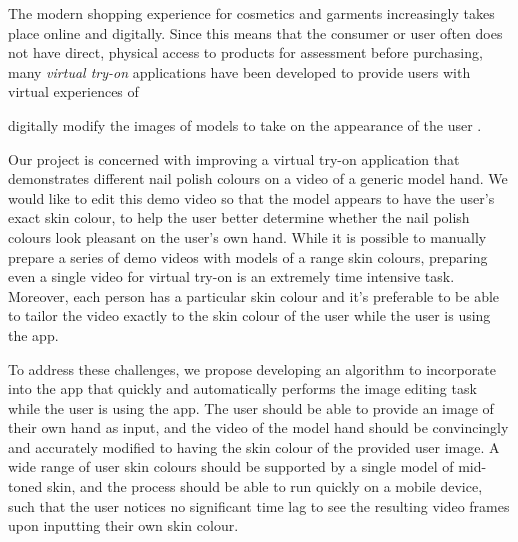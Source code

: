 The modern shopping experience for cosmetics and garments increasingly takes place online and digitally. Since this means that the consumer or user often does not have direct, physical access to products for assessment before purchasing, many \textit{virtual try-on} applications have been developed to provide users with virtual experiences of 

digitally modify the images of models to take on the appearance of the user \cite{zhang_2017_try} \cite{shilkrot_2013_garment, li_2015_replace}.


Our project is concerned with improving a virtual try-on application that demonstrates different nail polish colours on a video of a generic model hand. We would like to edit this demo video so that the model appears to have the user's exact skin colour, to help the user better determine whether the nail polish colours look pleasant on the user's own hand. While it is possible to manually prepare a series of demo videos with models of a range skin colours, preparing even a single video for virtual try-on is an extremely time intensive task. Moreover, each person has a particular skin colour and it's preferable to be able to tailor the video exactly to the skin colour of the user while the user is using the app.

To address these challenges, we propose developing an algorithm to incorporate into the app that quickly and automatically performs the image editing task while the user is using the app. The user should be able to provide an image of their own hand as input, and the video of the model hand should be convincingly and accurately modified to having the skin colour of the provided user image. A wide range of user skin colours should be supported by a single model of mid-toned skin, and the process should be able to run quickly on a mobile device, such that the user notices no significant time lag to see the resulting video frames upon inputting their own skin colour.

